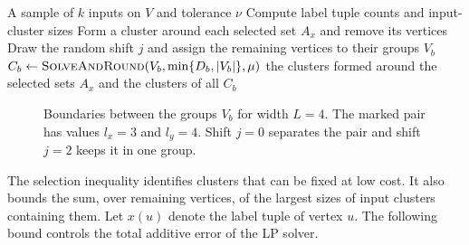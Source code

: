 \documentclass[11pt]{article}
\newcommand{\BandSeed}{\textup{\textsc{SolveAndRound}}}
\newcommand{\SampleSolve}{\textsc{Cluster}}
\begin{document}
\begin{algorithm}[htbp]
\caption{\SampleSolve\ on fixed input partitions}
\label{alg:offline}
\begin{algorithmic}[1]
\Require A sample of $k$ inputs on $V$ and tolerance $\nu$
\State Compute label tuple counts and input-cluster sizes
\State Form a cluster around each selected set $A_x$ and remove its vertices
\State Draw the random shift $j$ and assign the remaining vertices to their groups $V_b$
    \State $C_b\gets \BandSeed(V_b,\min\{D_b,|V_b|\},\mu)$
\EndFor
\State \Return the clusters formed around the selected sets $A_x$ and the clusters of all $C_b$
\end{algorithmic}
\end{algorithm}

\begin{figure}[htbp]
\centering
{}
\caption{Boundaries between the groups $V_b$ for width $L=4$. The marked pair has values $l_x=3$ and $l_y=4$. Shift $j=0$ separates the pair and shift $j=2$ keeps
it in one group.}
\label{fig:bands}
\end{figure}

The selection inequality identifies clusters that can be fixed at low cost.
It also bounds the sum, over remaining vertices, of the largest sizes
of input clusters containing them. Let $x(u)$ denote the label tuple of vertex $u$.
The following bound controls the total additive error of the LP solver.
\end{document}
